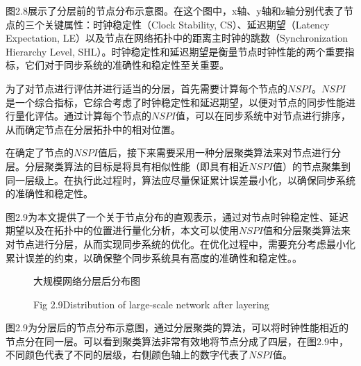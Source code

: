 \documentclass[UTF8,a4paper,12pt]{ctexart}
\numberwithin{equation}{section}
\begin{document}
	图2.8展示了分层前的节点分布示意图。在这个图中，x轴、y轴和z轴分别代表了节点的三个关键属性：时钟稳定性（Clock Stability, CS）、延迟期望（Latency Expectation, LE）以及节点在网络拓扑中的距离主时钟的跳数（Synchronization Hierarchy Level, SHL）。时钟稳定性和延迟期望是衡量节点时钟性能的两个重要指标，它们对于同步系统的准确性和稳定性至关重要。
	
	为了对节点进行评估并进行适当的分层，首先需要计算每个节点的$NSPI$。$NSPI$是一个综合指标，它综合考虑了时钟稳定性和延迟期望，以便对节点的同步性能进行量化评估。通过计算每个节点的$NSPI$值，可以在同步系统中对节点进行排序，从而确定节点在分层拓扑中的相对位置。
	
	在确定了节点的$NSPI$值后，接下来需要采用一种分层聚类算法来对节点进行分层。分层聚类算法的目标是将具有相似性能（即具有相近$NSPI$值）的节点聚集到同一层级上。在执行此过程时，算法应尽量保证累计误差最小化，以确保同步系统的准确性和稳定性。
	
	图2.9为本文提供了一个关于节点分布的直观表示，通过对节点时钟稳定性、延迟期望以及在拓扑中的位置进行量化分析，本文可以使用$NSPI$值和分层聚类算法来对节点进行分层，从而实现同步系统的优化。在优化过程中，需要充分考虑最小化累计误差的约束，以确保整个同步系统具有高度的准确性和稳定性。。
	\begin{figure}[H] 
		\caption{大规模网络分层后分布图}
		\vspace{-10pt}
		\caption*{Fig 2.9\quad Distribution of large-scale network after layering} 
	\end{figure}
	
	图2.9为分层后的节点分布示意图，通过分层聚类的算法，可以将时钟性能相近的节点分在同一层。可以看到聚类算法非常有效地将节点分成了四层，在图2.9中，不同颜色代表了不同的层级，右侧颜色轴上的数字代表了$NSPI$值。
	
\end{document}
